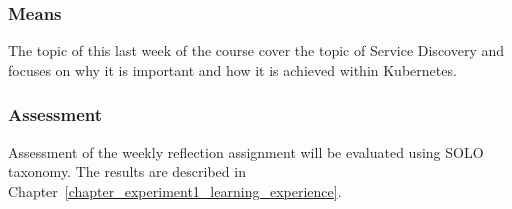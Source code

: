 \subsubsection*{Means}
The topic of this last week of the course cover the topic of Service Discovery and focuses on why it is important and how it is achieved within Kubernetes.

\subsubsection*{Assessment}
Assessment of the weekly reflection assignment will be evaluated using SOLO taxonomy. The results are described in Chapter~\ref{chapter_experiment1_learning_experience}. 

